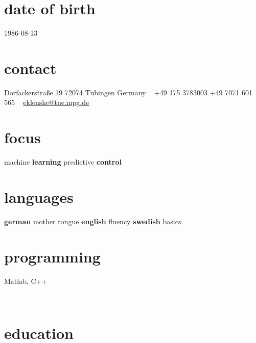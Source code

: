 \documentclass[]{k-cv} %
\begin{document}


\begin{aside} %
\section{date of birth}
\color{gray}1986-08-13
\section{contact}
\color{gray}Dorfackerstra{\ss}e 19
72074 T\"ubingen
Germany
~
+49 175 3783003
+49 7071 601 565
~
\href{mailto:eklenske@tue.mpg.de}{eklenske@tue.mpg.de}
\section{focus}
machine {\bfseries learning}
predictive {\bfseries control}
\section{languages}
{\bfseries german} mother tongue
{\bfseries english} fluency
{\bfseries swedish} basics
\section{programming}
Matlab, C++
\end{aside}

\
\section{education}\normalfont
\end{document}
